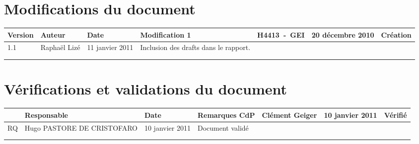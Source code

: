 
\section*{Modifications du document}

\begin{center}
\begin{longtable}{|m{14mm}||m{36mm}|m{36mm}|m{60mm}|}
\hline
Version & Auteur & Date & Modification\endhead \hline
1
& %
H4413~-~GEI
& %
20 décembre 2010
& %
Création
\\\hline
1.1
& %
Raphaël Lizé
& %
11 janvier 2011
& %
Inclusion des drafts dans le rapport.
\\\hline

& %

& %

& %

\\\hline

& %

& %

& %

\\\hline
\end{longtable}
\end{center}


\section*{Vérifications et validations du document}

\begin{center}
\begin{longtable}{|m{15mm}|m{36mm}|m{36mm}|m{60mm}|}
\hline
 & Responsable & Date & Remarques\endhead \hline
CdP
& %
Clément Geiger
& %
10 janvier 2011
& %
Vérifié
\\\hline
RQ
& %
Hugo PASTORE DE CRISTOFARO
& %
10 janvier 2011
& %
Document validé
\\\hline

& %

& %

& %

\\\hline

& %

& %

& %

\\\hline
\end{longtable}
\end{center}

\pagebreak
